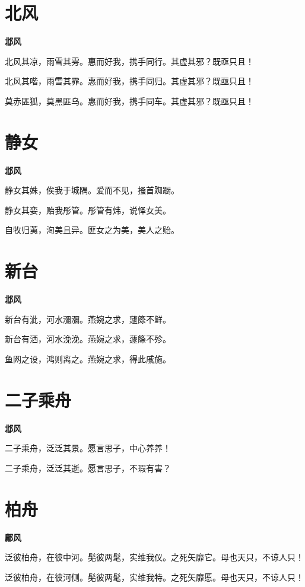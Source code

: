 \documentclass[12pt,a4paper]{ctexbook}
\begin{document}
\section{北风}
\textbf{邶风}\par\vspace{0.5em}
北风其凉，雨雪其雱。惠而好我，携手同行。其虚其邪？既亟只且！\par
北风其喈，雨雪其霏。惠而好我，携手同归。其虚其邪？既亟只且！\par
莫赤匪狐，莫黑匪乌。惠而好我，携手同车。其虚其邪？既亟只且！\par

\section{静女}
\textbf{邶风}\par\vspace{0.5em}
静女其姝，俟我于城隅。爱而不见，搔首踟蹰。\par
静女其娈，贻我彤管。彤管有炜，说怿女美。\par
自牧归荑，洵美且异。匪女之为美，美人之贻。\par

\section{新台}
\textbf{邶风}\par\vspace{0.5em}
新台有泚，河水瀰瀰。燕婉之求，蘧篨不鲜。\par
新台有洒，河水浼浼。燕婉之求，蘧篨不殄。\par
鱼网之设，鸿则离之。燕婉之求，得此戚施。\par

\section{二子乘舟}
\textbf{邶风}\par\vspace{0.5em}
二子乘舟，泛泛其景。愿言思子，中心养养！\par
二子乘舟，泛泛其逝。愿言思子，不瑕有害？\par

\section{柏舟}
\textbf{鄘风}\par\vspace{0.5em}
泛彼柏舟，在彼中河。髧彼两髦，实维我仪。之死矢靡它。母也天只，不谅人只！\par
泛彼柏舟，在彼河侧。髧彼两髦，实维我特。之死矢靡慝。母也天只，不谅人只！\par
\end{document}

